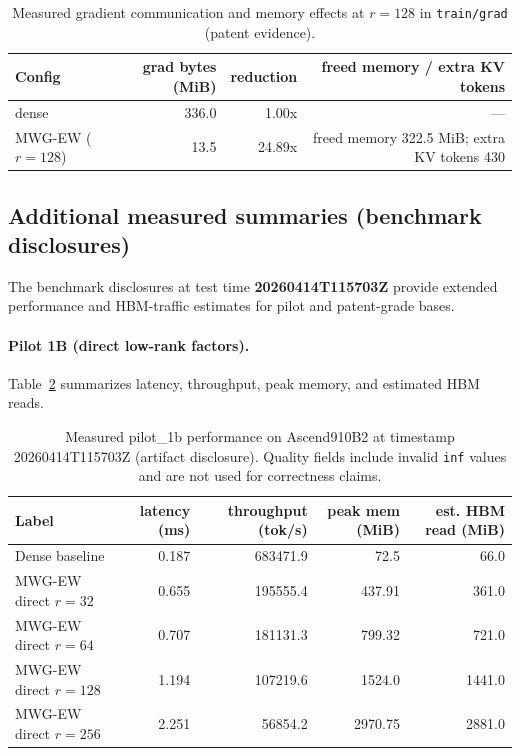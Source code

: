 \documentclass[11pt]{article}
\begin{document}
\begin{table}[t]
\centering
\caption{Measured gradient communication and memory effects at $r=128$ in \texttt{train/grad} (patent evidence).}
\label{tab:grad_patent_evidence}
\begin{tabular}{@{}lrrr@{}}
\toprule
Config & grad bytes (MiB) & reduction & freed memory / extra KV tokens \\
\midrule
dense & 336.0 & 1.00x & --- \\
MWG-EW ($r=128$) & 13.5 & 24.89x & freed memory 322.5 MiB; extra KV tokens 430 \\
\bottomrule
\end{tabular}
\end{table}

\subsection{Additional measured summaries (benchmark disclosures)}
The benchmark disclosures at test time \textbf{20260414T115703Z} provide extended performance and HBM-traffic estimates for pilot and patent-grade bases.

\paragraph{Pilot 1B (direct low-rank factors).}
Table~\ref{tab:pilot1b_bench} summarizes latency, throughput, peak memory, and estimated HBM reads.

\begin{table}[t]
\centering
\caption{Measured pilot\_1b performance on Ascend910B2 at timestamp 20260414T115703Z (artifact disclosure). Quality fields include invalid \texttt{inf} values and are not used for correctness claims.}
\label{tab:pilot1b_bench}
\begin{tabular}{@{}lrrrr@{}}
\toprule
Label & latency (ms) & throughput (tok/s) & peak mem (MiB) & est. HBM read (MiB) \\
\midrule
Dense baseline & 0.187 & 683471.9 & 72.5 & 66.0 \\
MWG-EW direct $r=32$ & 0.655 & 195555.4 & 437.91 & 361.0 \\
MWG-EW direct $r=64$ & 0.707 & 181131.3 & 799.32 & 721.0 \\
MWG-EW direct $r=128$ & 1.194 & 107219.6 & 1524.0 & 1441.0 \\
MWG-EW direct $r=256$ & 2.251 & 56854.2 & 2970.75 & 2881.0 \\
\bottomrule
\end{tabular}
\end{table}
\end{document}
